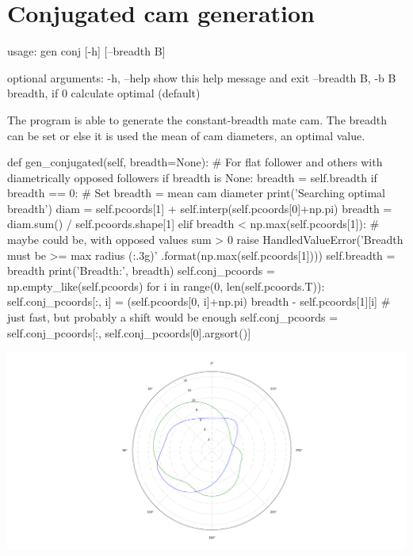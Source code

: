 \documentclass[a4paper,10pt,twoside]{article}
\renewenvironment{verbatim}{\begin{minipage}{\linewidth}\begin{oldverbatim}}{\end{oldverbatim}\end{minipage}}
\begin{document}
\section{Conjugated cam generation}
    \begin{verbatim}
    usage: gen conj [-h] [--breadth B]

    optional arguments:
      -h, --help            show this help message and exit
      --breadth B, -b B     breadth, if 0 calculate optimal (default)
    \end{verbatim}

    The program is able to generate the constant-breadth mate cam. The breadth can be set or else it is used
    the mean of cam diameters, an optimal value.

    \begin{pycode}
    def gen_conjugated(self, breadth=None):
        # For flat follower and others with diametrically opposed followers
        if breadth is None:
            breadth = self.breadth
        if breadth == 0:
            # Set breadth = mean cam diameter
            print('Searching optimal breadth')
            diam = self.pcoords[1] + self.interp(self.pcoords[0]+np.pi)
            breadth = diam.sum() / self.pcoords.shape[1]
        elif breadth < np.max(self.pcoords[1]):
            # maybe could be, with opposed values sum > 0
            raise HandledValueError('Breadth must be >= max radius ({:.3g})'
                                    .format(np.max(self.pcoords[1])))
        self.breadth = breadth
        print('Breadth:', breadth)
        self.conj_pcoords = np.empty_like(self.pcoords)
        for i in range(0, len(self.pcoords.T)):
            self.conj_pcoords[:, i] = (self.pcoords[0, i]+np.pi) %
                                       breadth - self.pcoords[1][i]
        # just fast, but probably a shift would be enough
        self.conj_pcoords = self.conj_pcoords[:, self.conj_pcoords[0].argsort()]
    \end{pycode}

    \includegraphics[width=\textwidth]{conj.png}
\end{document}
